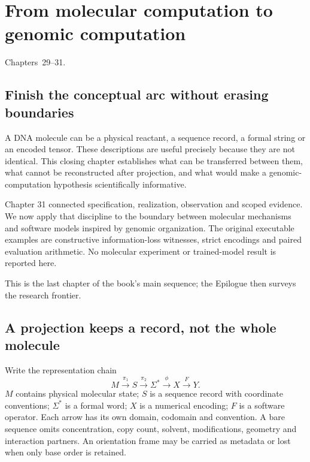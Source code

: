 \chapter{From molecular computation to genomic computation}
\label{ch:dna32}
{Chapters~29--31.}
\section{Finish the conceptual arc without erasing boundaries}
A DNA molecule can be a physical reactant, a sequence record, a formal string
or an encoded tensor. These descriptions are useful precisely because they
are not identical. This closing chapter establishes what can be transferred
between them, what cannot be reconstructed after projection, and what would
make a genomic-computation hypothesis scientifically informative.

Chapter 31 connected specification, realization, observation and scoped evidence.
We now apply that discipline to the boundary between molecular mechanisms and
software models inspired by genomic organization. The original executable
examples are constructive information-loss witnesses, strict encodings and
paired evaluation arithmetic. No molecular experiment or trained-model result
is reported here.

This is the last chapter of the book's main sequence; the Epilogue then
surveys the research frontier.

\section{A projection keeps a record, not the whole molecule}
Write the representation chain
\[
 M\xrightarrow{\pi_1}S\xrightarrow{\pi_2}\Sigma^*
 \xrightarrow{\phi}X\xrightarrow{F}Y.
\]
$M$ contains physical molecular state; $S$ is a sequence record with coordinate
conventions; $\Sigma^*$ is a formal word; $X$ is a numerical encoding; $F$ is a
software operator. Each arrow has its own domain, codomain and convention.
A bare sequence omits concentration, copy count, solvent, modifications,
geometry and interaction partners. An orientation frame may be carried as
metadata or lost when only base order is retained.

